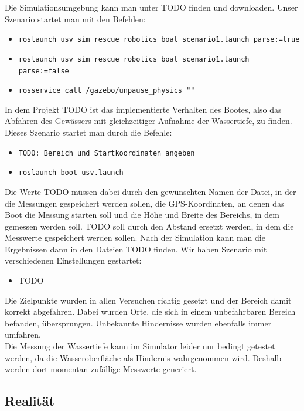 \documentclass[11pt]{article}
\begin{document}
Die Simulationsumgebung kann man unter TODO finden und downloaden. Unser Szenario startet man mit den Befehlen:
\begin{itemize}
	\item \texttt{roslaunch usv\_sim rescue\_robotics\_boat\_scenario1.launch parse:=true}
	\item \texttt{roslaunch usv\_sim rescue\_robotics\_boat\_scenario1.launch parse:=false}
	\item \texttt{rosservice call /gazebo/unpause\_physics "{}"}
\end{itemize}
In dem Projekt TODO ist das implementierte Verhalten des Bootes, also das Abfahren des Gewässers mit gleichzeitiger Aufnahme der Wassertiefe, zu finden. Dieses Szenario startet man durch die Befehle:
\begin{itemize}
	\item \texttt{TODO: Bereich und Startkoordinaten angeben}
	\item \texttt{roslaunch boot usv.launch}
\end{itemize}
Die Werte TODO müssen dabei durch den gewünschten Namen der Datei, in der die Messungen gespeichert werden sollen, die GPS-Koordinaten, an denen das Boot die Messung starten soll und die Höhe und Breite des Bereichs, in dem gemessen werden soll. TODO soll durch den Abstand ersetzt werden, in dem die Messwerte gespeichert werden sollen. Nach der Simulation kann man die Ergebnissen dann in den Dateien TODO finden.
Wir haben Szenario mit verschiedenen Einstellungen gestartet:
\begin{itemize}
	\item TODO
\end{itemize}
Die Zielpunkte wurden in allen Versuchen richtig gesetzt und der Bereich damit korrekt abgefahren. Dabei wurden Orte, die sich in einem unbefahrbaren Bereich befanden, übersprungen. Unbekannte Hindernisse wurden ebenfalls immer umfahren.\\
Die Messung der Wassertiefe kann im Simulator leider nur bedingt getestet werden, da die Wasseroberfläche als Hindernis wahrgenommen wird. Deshalb werden dort momentan zufällige Messwerte generiert.

\subsection{Realität}
\end{document}
